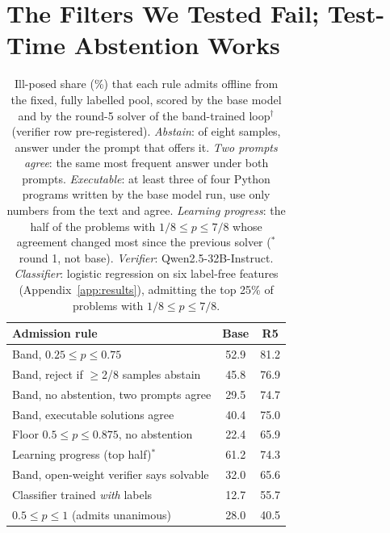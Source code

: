 \section{The Filters We Tested Fail; Test-Time Abstention Works}
\label{sec:remedies}

\begin{table}[t]
\centering
\footnotesize
\setlength{\tabcolsep}{3pt}
\begin{tabular}{lcc}
\toprule
Admission rule & Base & R5 \\
\midrule
Band, $0.25 \le p \le 0.75$ & 52.9 & 81.2 \\
Band, reject if $\ge$2/8 samples abstain & 45.8 & 76.9 \\
Band, no abstention, two prompts agree & 29.5 & 74.7 \\
Band, executable solutions agree & 40.4 & 75.0 \\
Floor $0.5 \le p \le 0.875$, no abstention & 22.4 & 65.9 \\
Learning progress (top half)$^{\ast}$ & 61.2 & 74.3 \\
\midrule
Band, open-weight verifier says solvable & 32.0 & 65.6 \\
Classifier trained \emph{with} labels & 12.7 & 55.7 \\
$0.5 \le p \le 1$ (admits unanimous) & 28.0 & 40.5 \\
\bottomrule
\end{tabular}
\caption{Ill-posed share (\%) that each rule admits offline from the fixed, fully labelled pool, scored by the base model and by the round-5 solver of the band-trained loop$^{\dagger}$ (verifier row pre-registered). \emph{Abstain}: of eight samples, answer \unk{} under the prompt that offers it. \emph{Two prompts agree}: the same most frequent answer under both prompts. \emph{Executable}: at least three of four Python programs written by the base model run, use only numbers from the text and agree. \emph{Learning progress}: the half of the problems with $1/8 \le p \le 7/8$ whose agreement changed most since the previous solver ($^{\ast}$round 1, not base). \emph{Verifier}: Qwen2.5-32B-Instruct. \emph{Classifier}: logistic regression on six label-free features (Appendix~\ref{app:results}), admitting the top 25\% of problems with $1/8 \le p \le 7/8$.}
\label{tab:filters}
\end{table}


